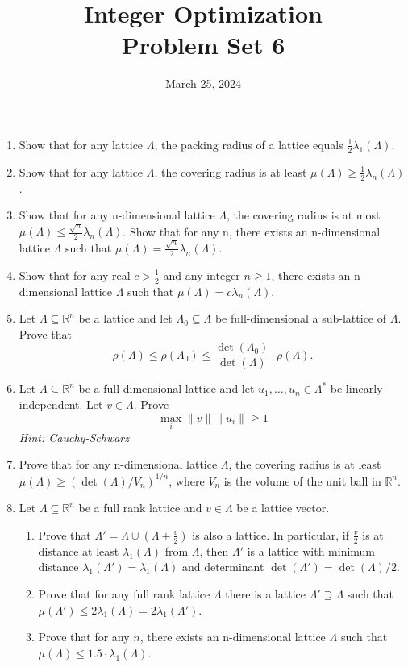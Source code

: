 \documentclass[11pt,a4paper]{article}
\title{Integer Optimization  \\ Problem Set 6 }
\date{ March 25, 2024}
\begin{document}
\maketitle 


\begin{enumerate}
\item Show that for any lattice $Λ$, the packing radius of a lattice equals $\frac{1}{2}λ_1(Λ)$.

\item Show that for any lattice $Λ$, the covering radius is at least $μ(Λ) ≥ \frac{1}{2} λ_n (Λ)$.

\item Show that for any n-dimensional lattice $Λ$, the covering radius is at most $
μ(Λ) ≤ \frac{\sqrt{n}}{2} λ_n(Λ)$. Show that for any n, there exists an n-dimensional lattice $Λ$ such that $μ(Λ) =\frac{\sqrt{n}}{2} λ_n(Λ)$.

\item Show that for any real $c > \frac{1}{2}$ and any integer $n ≥ 1$, there exists an n- dimensional lattice $Λ$ such that $μ(Λ) = cλ_n(Λ)$.

  \item Let $Λ ⊆ ℝ^n$ be a lattice and let $Λ_0⊆Λ$  be  full-dimensional a sub-lattice of $Λ$. Prove that
  \begin{displaymath}
    ρ(Λ) ≤ ρ(Λ_0) ≤ \frac{\det(Λ_0)}{ \det(Λ)} ⋅ ρ(Λ). 
  \end{displaymath}
\item Let $Λ ⊆ ℝ^n$ be a full-dimensional lattice and let $u_1,\dots,u_n ∈ Λ^*$ be linearly independent. Let $v ∈ Λ$. Prove
  \begin{displaymath}
    \max_i \|v\| \|u_i\| ≥1
  \end{displaymath}
  \hfill \emph{Hint: Cauchy-Schwarz} 
  
\item Prove that for any n-dimensional lattice $Λ$, the covering radius is at least $μ(Λ) ≥ (\det(Λ)/V_n)^{1/n}$, where $V_n$ is the volume of the unit ball in $\mathbb{R}^n$.

\item Let $Λ ⊆ \mathbb{R}^n$ be a full rank lattice and $v ∈ Λ$ be a lattice vector. \begin{enumerate}
\item Prove that $Λ' = Λ ∪ (Λ + \frac{v}{2} )$ is also a lattice. In particular, if $\frac{v}{2}$ is at distance at least $λ_1 (Λ)$ from $Λ$, then $Λ'$ is a lattice with minimum distance $λ_1(Λ') = λ_1(Λ)$ and determinant $\det(Λ') = \det(Λ)/2$. 
\item Prove that for any full rank lattice $Λ$ there is a lattice $Λ' ⊇ Λ$ such that $μ(Λ') ≤ 2λ_1(Λ) = 2λ_1(Λ')$.
\item Prove that for any $n$, there exists an n-dimensional lattice $Λ$ such that $μ(Λ) ≤ 1.5 \cdot λ_1(Λ)$.

\end{enumerate}



\end{enumerate}


%
%


 
\end{document}
